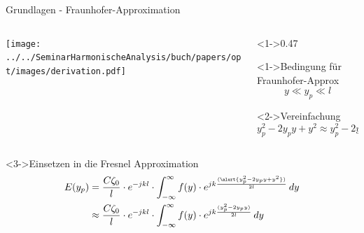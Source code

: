 \begin{frame}{Grundlagen - Fraunhofer-Approximation}
    \begin{columns}
        \begin{column}[onlytextwidth]{0.47\textwidth}
            \centering
            \texttt{[image: ../../SeminarHarmonischeAnalysis/buch/papers/opt/images/derivation.pdf]}
        \end{column}
        \begin{column}[onlytextwidth]<1->{0.47\textwidth}
            \begin{alertblock}<1->{Bedingung für Fraunhofer-Approx}
                \begin{equation*}
                    y
                    \ll
                    y_p
                    \ll
                    l
                \end{equation*}
            \end{alertblock}
            \begin{block}<2->{Vereinfachung}
                \begin{equation*}
                    y_p^2 - 2y_py + y^2 \approx y_p^2 - 2y_py
                \end{equation*}
            \end{block}
        \end{column}
    \end{columns}
    \begin{block}<3->{Einsetzen in die Fresnel Approximation}
        \begin{align*}
            E(y_p)
            &=
            \frac{C\zeta_0}{l} \cdot e^{-jkl} \cdot \int_{-\infty}^{\infty}f(y)\cdot e^{jk\frac{(\alert{y_p^2 - 2y_py + y^2})}{2l}} \,dy
            \\
            &\approx
            \frac{C\zeta_0}{l} \cdot e^{-jkl} \cdot \int_{-\infty}^{\infty}f(y)\cdot e^{jk\frac{(y_p^2 - 2y_py)}{2l}} \,dy
        \end{align*}
    \end{block}
\end{frame}

